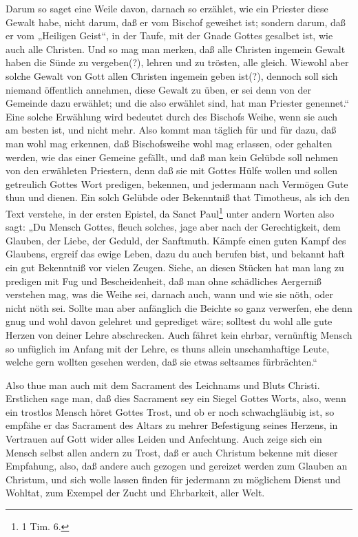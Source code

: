 Darum so saget eine Weile davon, darnach so erzählet, wie ein Priester diese Gewalt habe, nicht darum, daß er vom Bischof geweihet ist; sondern darum, daß er vom „Heiligen Geist“, in der Taufe, mit der Gnade Gottes gesalbet ist, wie auch alle Christen. Und so mag man merken, daß alle Christen ingemein Gewalt haben die Sünde zu vergeben(?), lehren und zu trösten, alle gleich. Wiewohl aber solche Gewalt von Gott allen Christen ingemein geben ist(?), dennoch soll sich niemand öffentlich annehmen, diese Gewalt zu üben, er sei denn von der Gemeinde dazu erwählet; und die also erwählet sind, hat man Priester genennet.“ Eine solche Erwählung wird bedeutet durch des Bischofs Weihe, wenn sie auch am besten ist, und nicht mehr. Also kommt man täglich für und für dazu, daß man wohl mag erkennen, daß Bischofsweihe wohl mag erlassen, oder gehalten werden, wie das einer Gemeine gefällt, und daß man kein Gelübde soll nehmen von den erwähleten Priestern, denn daß sie mit Gottes Hülfe wollen und sollen getreulich Gottes Wort predigen, bekennen, und jedermann nach Vermögen Gute thun und dienen. Ein solch Gelübde oder Bekenntniß that Timotheus, als ich den Text verstehe, in der ersten Epistel, da Sanct Paul\footnote{1 Tim. 6.} unter andern Worten also sagt: „Du Mensch Gottes, fleuch solches, jage aber nach der Gerechtigkeit, dem Glauben, der Liebe, der Geduld, der Sanftmuth. Kämpfe einen guten Kampf des Glaubens, ergreif das ewige Leben, dazu du auch berufen bist, und bekannt haft ein gut Bekenntniß vor vielen Zeugen. Siehe, an diesen Stücken hat man lang zu predigen mit Fug und Bescheidenheit, daß man ohne schädliches Aergerniß verstehen mag, was die Weihe
sei, darnach auch, wann und wie sie nöth, oder nicht nöth sei. Sollte man aber anfänglich die Beichte so ganz verwerfen, ehe denn gnug und wohl davon gelehret und geprediget wäre; solltest du wohl alle gute Herzen von deiner Lehre abschrecken. Auch fähret kein ehrbar, vernünftig Mensch so unfüglich im Anfang mit der Lehre, es thuns allein unschamhaftige Leute, welche gern wollten gesehen werden, daß sie etwas seltsames fürbrächten.“

Also thue man auch mit dem Sacrament des Leichnams und Bluts Christi. Erstlichen sage man, daß dies Sacrament sey ein Siegel Gottes Worts, also, wenn ein trostlos Mensch höret Gottes Trost, und ob er noch schwachgläubig ist, so empfähe er das Sacrament des Altars zu mehrer Befestigung seines Herzens, in Vertrauen auf Gott wider alles Leiden und Anfechtung. Auch zeige sich ein Mensch selbst allen andern zu Trost, daß er auch Christum bekenne mit dieser Empfahung, also, daß andere auch gezogen und gereizet werden zum Glauben an Christum, und sich wolle lassen finden für jedermann zu möglichem Dienst und Wohltat, zum Exempel der Zucht und Ehrbarkeit, aller Welt.


